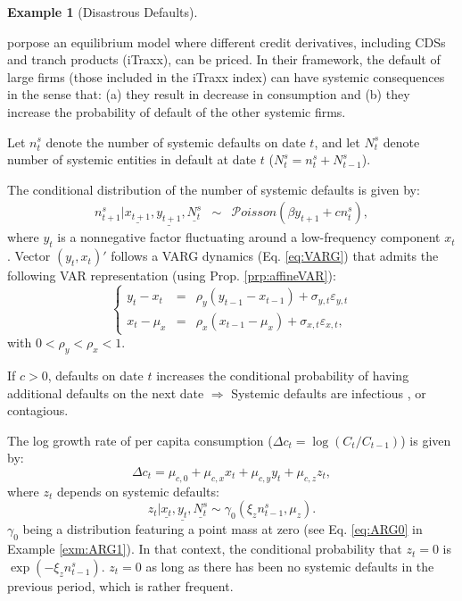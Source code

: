 \documentclass[
  12pt,
]{book}
\theoremstyle{definition}
\theoremstyle{definition}
\newtheorem{example}{Example}[chapter]
\theoremstyle{definition}
\theoremstyle{definition}
\theoremstyle{remark}
\begin{document}
\begin{example}[Disastrous Defaults]
\protect\hypertarget{exm:DD}{}\label{exm:DD}

\citet{Gourieroux_Monfort_Mouabbi_Renne_2021} porpose an equilibrium model where different credit derivatives, including CDSs and tranch products (iTraxx), can be priced. In their framework, the default of large firms (those included in the iTraxx index) can have systemic consequences in the sense that: (a) they result in decrease in consumption and (b) they increase the probability of default of the other systemic firms.

Let \(n^s_{t}\) denote the number of systemic defaults on date \(t\), and let \(N^s_{t}\) denote number of systemic entities in default at date \(t\) (\(N^s_{t}=n^s_{t} + N^s_{t-1}\)).

The conditional distribution of the number of systemic defaults is given by:
\begin{eqnarray}
n^s_{t+1}| \underline{x_{t+1}}, \underline{y_{t+1}}, \underline{N^s_{t}}  &\sim& \mathcal{P}oisson(\beta y_{t+1}+c n^s_{t}),\label{eq:ndistrinew}
\end{eqnarray}
where \(y_t\) is a nonnegative factor fluctuating around a low-frequency component \(x_t\). Vector \((y_t,x_t)'\) follows a VARG dynamics (Eq. \eqref{eq:VARG}) that admits the following VAR representation (using Prop. \ref{prp:affineVAR}):
\begin{equation}
\left\{
\begin{array}{ccl}
y_t - x_t &=& \rho_y (y_{t-1} - x_{t-1}) + \sigma_{y,t}\varepsilon_{y,t}\\
x_t - \mu_x  &=& \rho_x (x_{t-1} - \mu_x) + \sigma_{x,t}\varepsilon_{x,t},
\end{array}
\right.\label{eq:systemF12}
\end{equation}
with \(0<\rho_y<\rho_x<1\).

If \(c>0\), defaults on date \(t\) increases the conditional probability of having additional defaults on the next date \(\Rightarrow\) Systemic defaults are infectious \citep{Davis_Lo_2001}, or contagious.

The log growth rate of per capita consumption (\(\Delta c_t = \log(C_t/C_{t-1})\)) is given by:
\begin{equation}
\Delta c_t = \mu_{c,0} + \mu_{c,x} x_t + \mu_{c,y} y_t + {\mu_{c,z}} z_{t},\label{eq:Deltacrewritten}
\end{equation}
where \(z_t\) depends on systemic defaults:
\begin{equation}
z_t|  \underline{x_{t}}, \underline{y_{t}}, \underline{N^s_{t}}  \sim \gamma_0(\xi_{z}n^s_{t-1},\mu_z).\label{eq:Zdistrinew}
\end{equation}
\(\gamma_0\) being a distribution featuring a point mass at zero (see Eq. \eqref{eq:ARG0} in Example \ref{exm:ARG1}). In that context, the conditional probability that \(z_t=0\) is \(\exp(-\xi_{z}n^s_{t-1})\). \(z_{t}=0\) as long as there has been no systemic defaults in the previous period, which is rather frequent.


\end{example}
\end{document}
